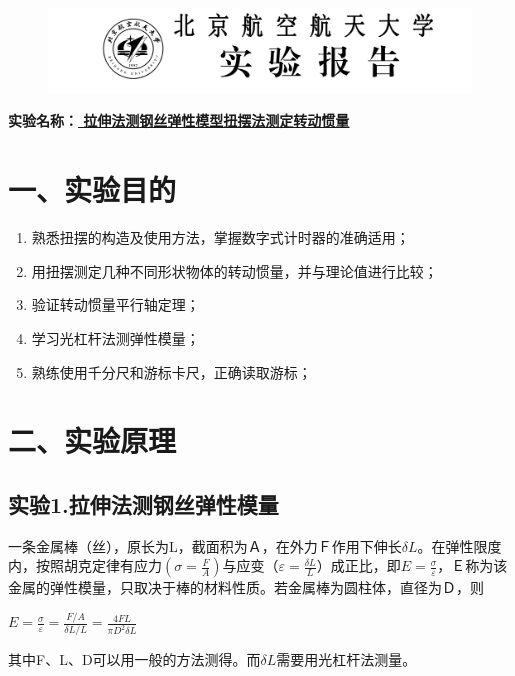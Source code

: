 \documentclass[11pt,a4paper,oneside]{article}
\begin{document}
\begin{figure}[H]
 \centering
  \includegraphics[width=13cm]{Image/表头.png}
\end{figure}
\begin{center}
\textbf{{\large 实验名称：\uline{          拉伸法测钢丝弹性模型扭摆法测定转动惯量       }}}
\end{center}


\section*{一、实验目的}
\begin{enumerate}
\item 熟悉扭摆的构造及使用方法，掌握数字式计时器的准确适用；
\item 用扭摆测定几种不同形状物体的转动惯量，并与理论值进行比较；
\item 验证转动惯量平行轴定理；
\item 学习光杠杆法测弹性模量；
\item 熟练使用千分尺和游标卡尺，正确读取游标；
\end{enumerate}

\section*{二、实验原理}
\subsection*{实验1.拉伸法测钢丝弹性模量}
一条金属棒（丝），原长为L，截面积为Ａ，在外力Ｆ作用下伸长$\delta L$。在弹性限度内，按照胡克定律有应力$(\sigma =\displaystyle\frac{F}{A})$与应变$（\varepsilon =\displaystyle\frac{\delta L}{L}）$成正比，即$E=\displaystyle\frac{\sigma }{\varepsilon }$，Ｅ称为该金属的弹性模量，只取决于棒的材料性质。若金属棒为圆柱体，直径为Ｄ，则
\begin{center}
$　E=\displaystyle\frac{\sigma }{\varepsilon }=\displaystyle\frac{F/A}{\delta L/L}=\displaystyle\frac{4FL}{\pi D^{2}\delta L}$
\end{center}
其中F、L、D可以用一般的方法测得。而$\delta L$需要用光杠杆法测量。
\end{document}
